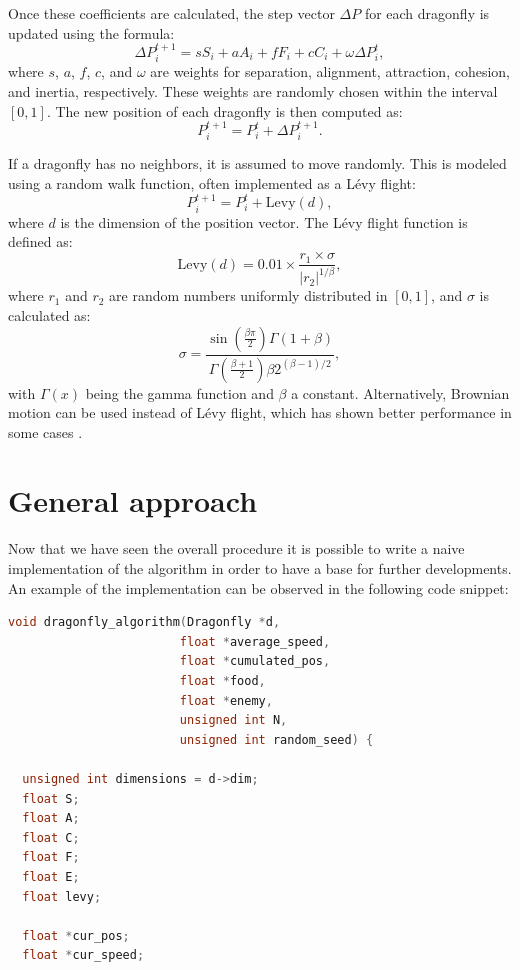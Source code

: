 \documentclass[10pt]{article}
\begin{document}
\begin{multicols}{2}
\noindent Once these coefficients are calculated, the step vector $\Delta P$ for each dragonfly is updated using the formula:
$$\Delta P_i^{t+1} = sS_i + aA_i + fF_i + cC_i + \omega \Delta P_i^t,$$
where $s$, $a$, $f$, $c$, and $\omega$ are weights for separation, alignment, attraction, cohesion, and inertia, respectively. These weights are randomly chosen within the interval $[0,1]$. The new position of each dragonfly is then computed as:
$$P_i^{t+1} = P_i^t + \Delta P_i^{t+1}.$$

If a dragonfly has no neighbors, it is assumed to move randomly. This is modeled using a random walk function, often implemented as a Lévy flight:
$$P_i^{t+1} = P_i^t + \mathrm{Levy}(d),$$
where $d$ is the dimension of the position vector. The Lévy flight function is defined as:
$$\mathrm{Levy}(d) = 0.01 \times \frac{r_1 \times \sigma}{|r_2|^{1/\beta}},$$
where $r_1$ and $r_2$ are random numbers uniformly distributed in $[0,1]$, and $\sigma$ is calculated as:
$$\sigma = \frac{\sin\left(\frac{\beta \pi}{2}\right) \Gamma(1+\beta)}{\Gamma\left(\frac{\beta+1}{2}\right) \beta 2^{(\beta-1)/2}},$$
with $\Gamma(x)$ being the gamma function and $\beta$ a constant. Alternatively, Brownian motion can be used instead of Lévy flight, which has shown better performance in some cases \cite{BDragonfly}.



\section{General approach}

Now that we have seen the overall procedure it is possible to write a naive implementation of the algorithm in order to 
have a base for further developments. An example of the implementation can be observed in the following code snippet:


\begin{lstlisting}[language=C,caption={first implementation of the dragonfly algorithm}]
void dragonfly_algorithm(Dragonfly *d, 
                        float *average_speed,
                        float *cumulated_pos, 
                        float *food, 
                        float *enemy,
                        unsigned int N, 
                        unsigned int random_seed) {

  unsigned int dimensions = d->dim;
  float S;
  float A;
  float C;
  float F;
  float E;
  float levy;

  float *cur_pos;
  float *cur_speed;


\end{lstlisting}
\end{multicols}
\end{document}
